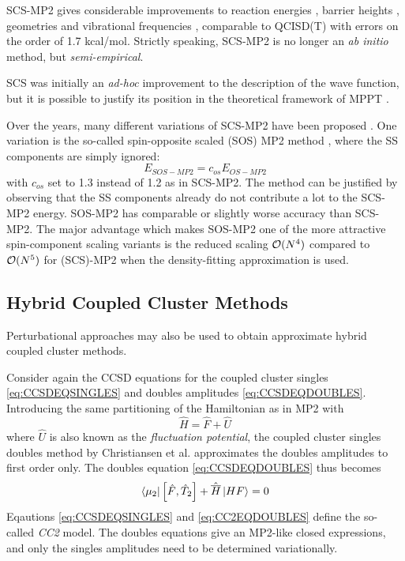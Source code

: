 SCS-MP2 gives considerable improvements to reaction energies \cite{Gri2003}, barrier heights \cite{Gou2004,Bul2004}, geometries and vibrational frequencies \cite{Ger2004}, comparable to QCISD(T) with errors on the order of 1.7 kcal/mol. Strictly speaking, SCS-MP2 is no longer an \emph{ab initio} method, but \emph{semi-empirical}. 

SCS was initially an \emph{ad-hoc} improvement to the description of the wave function, but it is possible to justify its position in the theoretical framework of MPPT \cite{Sza2006,Fin2010}. 

Over the years, many different variations of SCS-MP2 have been proposed \cite{Jun2004,Loc2005,Dis2007,Hil2007}. One variation is the so-called spin-opposite scaled (SOS) MP2 method \cite{Jun2004}, where the SS components are simply ignored:
\begin{equation}
E_{SOS-MP2} = c_{os} E_{OS-MP2}
\end{equation}
\noindent with $c_{os}$ set to 1.3 instead of 1.2 as in SCS-MP2. The method can be justified by observing that the SS components already do not contribute a lot to the SCS-MP2 energy. SOS-MP2 has comparable or slightly worse accuracy than SCS-MP2. The major advantage which makes SOS-MP2 one of the more attractive spin-component scaling variants is the reduced scaling $\mathcal{O}(N^{4})$ compared to $\mathcal{O}(N^{5})$ for (SCS)-MP2 when the density-fitting approximation is used.

\subsection{Hybrid Coupled Cluster Methods}

Perturbational approaches may also be used to obtain approximate hybrid coupled cluster methods. 

Consider again the CCSD equations for the coupled cluster singles \ref{eq:CCSDEQSINGLES} and doubles amplitudes \ref{eq:CCSDEQDOUBLES}. Introducing the same partitioning of the Hamiltonian as in MP2 with
\begin{equation}
\hat{H} = \hat{F} + \hat{U}
\end{equation}
\noindent where $\hat{U}$ is also known as the \emph{fluctuation potential}, the coupled cluster singles doubles method by Christiansen et al. \cite{Chr1995} approximates the doubles amplitudes to first order only. The doubles equation \ref{eq:CCSDEQDOUBLES} thus becomes
\begin{equation}
\bra{\smash{\mu_2}} \left[ \hat{F}, \hat{T}_2\right] + \hat{\overline{H}} \ket{\smash{HF}} = 0
\label{eq:CC2EQDOUBLES}
\end{equation}
\noindent Eqautions \ref{eq:CCSDEQSINGLES} and \ref{eq:CC2EQDOUBLES} define the so-called \emph{CC2} model. The doubles equations give an MP2-like closed expressions, and only the singles amplitudes need to be determined variationally.

